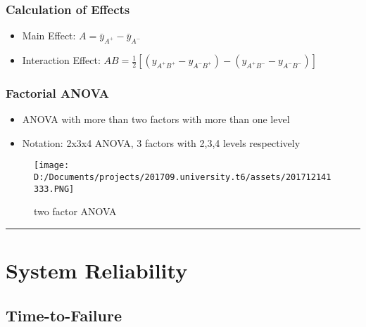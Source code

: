 \documentclass[11pt]{article}
\makeatletter
\def\maxwidth{\ifdim\Gin@nat@width>\linewidth\linewidth
    \else\Gin@nat@width\fi}
\let\Oldincludegraphics\includegraphics
\renewcommand{\includegraphics}[1]{\Oldincludegraphics[width=.8\maxwidth]{#1}}
\providecommand{\tightlist}{%
      \setlength{\itemsep}{0pt}\setlength{\parskip}{0pt}}
\makeatother
\begin{document}
\hypertarget{calculation-of-effects}{%
\subsubsection{Calculation of Effects}\label{calculation-of-effects}}

\begin{itemize}
\tightlist
\item
  Main Effect: \(A=\bar y_{A^+}-\bar y_{A^-}\)
\item
  Interaction Effect:
  \(AB=\frac{1}{2}[(y_{A^+B^+}-y_{A^-B^+})-(y_{A^+B^-}-y_{A^-B^-})]\)
\end{itemize}

\hypertarget{factorial-anova}{%
\subsubsection{Factorial ANOVA}\label{factorial-anova}}

\begin{itemize}
\tightlist
\item
  ANOVA with more than two factors with more than one level
\item
  Notation: 2x3x4 ANOVA, 3 factors with 2,3,4 levels respectively
\end{itemize}

\begin{figure}
\centering
\texttt{[image: D:/Documents/projects/201709.university.t6/assets/201712141333.PNG]}
\caption{two factor ANOVA}
\end{figure}

\begin{center}\rule{0.5\linewidth}{\linethickness}\end{center}

    \hypertarget{system-reliability}{%
\section{System Reliability}\label{system-reliability}}

\hypertarget{time-to-failure}{%
\subsection{Time-to-Failure}\label{time-to-failure}}
\end{document}
